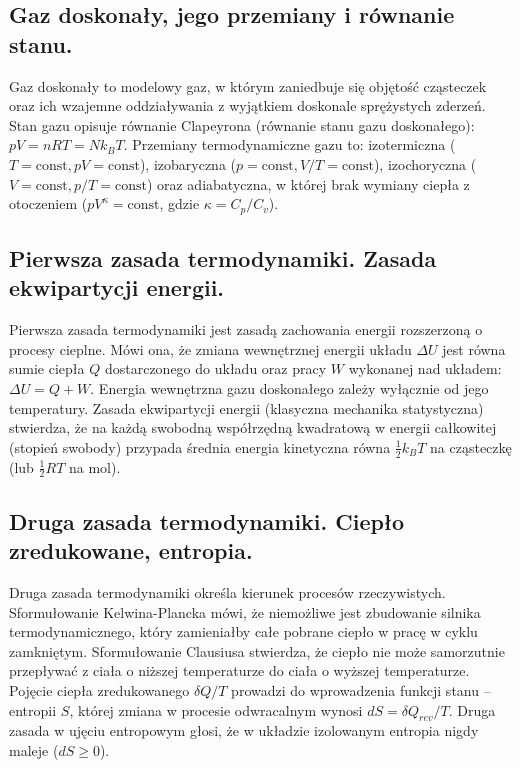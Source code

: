 \documentclass[11pt,a4paper]{article}
\begin{document}
\subsection{Gaz doskonały, jego przemiany i równanie stanu.}
Gaz doskonały to modelowy gaz, w którym zaniedbuje się objętość cząsteczek oraz ich wzajemne oddziaływania z wyjątkiem doskonale sprężystych zderzeń. Stan gazu opisuje równanie Clapeyrona (równanie stanu gazu doskonałego): $pV = nRT = N k_B T$. Przemiany termodynamiczne gazu to: izotermiczna ($T = \text{const}, pV = \text{const}$), izobaryczna ($p = \text{const}, V/T = \text{const}$), izochoryczna ($V = \text{const}, p/T = \text{const}$) oraz adiabatyczna, w której brak wymiany ciepła z otoczeniem ($pV^\kappa = \text{const}$, gdzie $\kappa = C_p/C_v$).

\subsection{Pierwsza zasada termodynamiki. Zasada ekwipartycji energii.}
Pierwsza zasada termodynamiki jest zasadą zachowania energii rozszerzoną o procesy cieplne. Mówi ona, że zmiana wewnętrznej energii układu $\Delta U$ jest równa sumie ciepła $Q$ dostarczonego do układu oraz pracy $W$ wykonanej nad układem: $\Delta U = Q + W$. Energia wewnętrzna gazu doskonałego zależy wyłącznie od jego temperatury. Zasada ekwipartycji energii (klasyczna mechanika statystyczna) stwierdza, że na każdą swobodną współrzędną kwadratową w energii całkowitej (stopień swobody) przypada średnia energia kinetyczna równa $\frac{1}{2}k_B T$ na cząsteczkę (lub $\frac{1}{2}RT$ na mol).

\subsection{Druga zasada termodynamiki. Ciepło zredukowane, entropia.}
Druga zasada termodynamiki określa kierunek procesów rzeczywistych. Sformułowanie Kelwina-Plancka mówi, że niemożliwe jest zbudowanie silnika termodynamicznego, który zamieniałby całe pobrane ciepło w pracę w cyklu zamkniętym. Sformułowanie Clausiusa stwierdza, że ciepło nie może samorzutnie przepływać z ciała o niższej temperaturze do ciała o wyższej temperaturze. Pojęcie ciepła zredukowanego $\delta Q/T$ prowadzi do wprowadzenia funkcji stanu -- entropii $S$, której zmiana w procesie odwracalnym wynosi $dS = \delta Q_{rev} / T$. Druga zasada w ujęciu entropowym głosi, że w układzie izolowanym entropia nigdy maleje ($dS \ge 0$).
\end{document}
